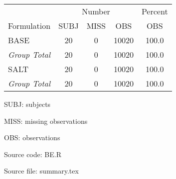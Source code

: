 \setlength{\tabcolsep}{5pt} 
\begin{threeparttable}
\renewcommand{\arraystretch}{1.3}
\begin{tabular}[h]{lcccc}
\hline
\multicolumn{1}{c}{} & \multicolumn{3}{c}{Number} & \multicolumn{1}{c}{Percent} \\
\cmidrule(lr){2-4}
\cmidrule(lr){5-5}
Formulation & SUBJ & MISS & OBS & OBS \\
\hline
BASE & 20 & 0 & 10020 & 100.0 \\
\hline {\it Group Total} & 20 & 0 & 10020 & 100.0 \\
SALT & 20 & 0 & 10020 & 100.0 \\
\hline {\it Group Total} & 20 & 0 & 10020 & 100.0 \\
\hline
\end{tabular}
\begin{tablenotes}[flushleft]
\item SUBJ: subjects
\item MISS: missing observations
\item OBS: observations
\item Source code: BE.R
\item Source file: summary.tex
\end{tablenotes}
\end{threeparttable}

